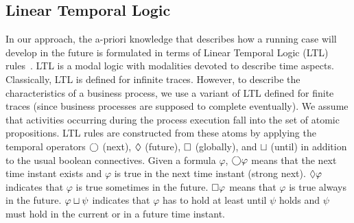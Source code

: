 

		
		




\subsection{Linear Temporal Logic}
In our approach, the a-priori knowledge that describes how a running case will develop in the future is formulated in terms of Linear Temporal Logic (LTL) rules~\cite{Pnueli77}. LTL is a modal logic with modalities devoted to describe time aspects. Classically, LTL is defined for infinite traces. However, to describe the characteristics of a business process, we use a variant of LTL defined for finite traces (since business processes are supposed to complete eventually).
%
We assume that activities occurring during the process execution fall into the set of atomic propositions. LTL rules are constructed from these atoms by applying the temporal operators $\bigcirc$ (next), $\lozenge$ (future), $\square$ (globally), and $\sqcup$ (until) in addition to the usual boolean connectives. Given a formula $\varphi$, $\bigcirc \varphi$ means that the next time instant exists and $\varphi$ is true in the next time instant (strong next). $\lozenge \varphi$ indicates that $\varphi$ is true sometimes in the future. $\square \varphi$ means that $\varphi$ is true always in the future. $\varphi \sqcup \psi$ indicates that $\varphi$ has to hold at least until $\psi$  holds and $\psi$ must hold in the current or in a future time instant.


